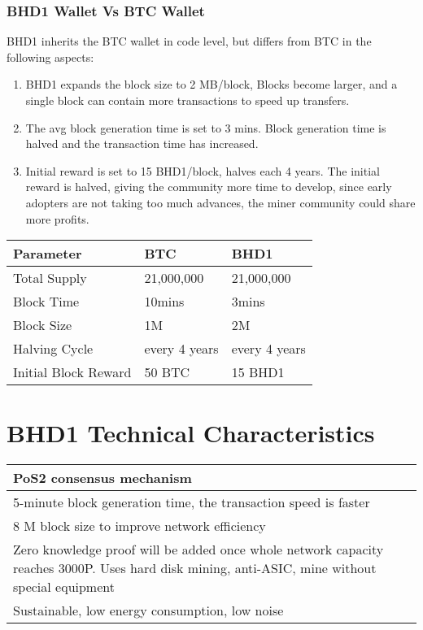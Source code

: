 \subsubsection{BHD1 Wallet Vs BTC Wallet}
\begin{flushleft}
    BHD1 inherits the BTC wallet in code level, but differs from BTC in the following aspects:
\end{flushleft}
\begin{enumerate}
    \item BHD1 expands the block size to 2 MB/block, Blocks become larger, and a single block can contain more transactions to speed up transfers.
    \item The avg block generation time is set to 3 mins. Block generation time is halved and the transaction time has increased.
    \item Initial reward is set to 15 BHD1/block, halves each 4 years. The initial reward is halved, giving the community more time to develop, since early adopters are not taking too much advances, the miner community could share more profits.
\end{enumerate}
\begin{tabular}{ |p{5cm}|p{3cm}|p{3cm}| }
    \hline
    \rowcolor{lightgray} \textbf{Parameter} & \textbf{BTC} & \textbf{BHD1} \\[5pt]
    \hline
    Total Supply & 21,000,000 & 21,000,000 \\[5pt]
    \rowcolor{lightgray!30} Block Time & 10mins & 3mins \\[5pt]
    Block Size & 1M & 2M \\[5pt]
    \rowcolor{lightgray!30} Halving Cycle & every 4 years & every 4 years \\[5pt]
    Initial Block Reward & 50 BTC & 15 BHD1 \\[5pt]
    \hline
\end{tabular}
\section{BHD1 Technical Characteristics}
\begin{tabular}{ |p{12cm}| }
    \hline
    PoS2 consensus mechanism\\[5pt]
    \hline
    5-minute block generation time, the transaction speed is faster\\[5pt]
    \hline
    8 M block size to improve network efficiency\\[5pt]
    \hline
    Zero knowledge proof will be added once whole network capacity reaches 3000P. Uses hard disk mining, anti-ASIC, mine without special equipment\\[5pt]
    \hline
    Sustainable, low energy consumption, low noise\\[5pt]
    \hline
\end{tabular}
